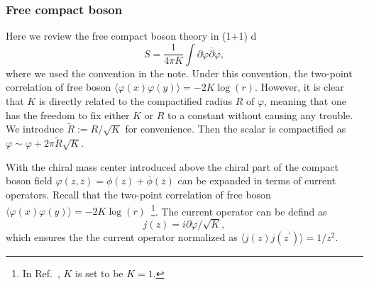 \documentclass[submission, PhysLectNotes]{SciPost}
\begin{document}
\subsubsection{Free compact boson}
Here we review the free compact boson theory in (1+1) d
\begin{equation}
	S = \frac{1}{4\pi K} \int \partial \varphi \overline{\partial}\varphi,
\end{equation}
where we used the convention in the note. Under this convention, the two-point correlation of free boson $\langle \varphi (x) \varphi(y) \rangle = -2 K \log (r)$. However, it is clear that $K$ is directly related to the compactified radius $R$ of $\varphi$, meaning that one has the freedom to fix either $K$ or $R$ to a constant without causing any trouble. We introduce $\tilde{R} := R/\sqrt{K}$ for convenience. Then the scalar is compactified as $\varphi \sim \varphi + 2\pi \tilde{R}\sqrt{K}$. %

With the chiral mass center introduced above the chiral part of the compact boson field $\varphi(z,\overline{z}) = \phi(z) + \overline{\phi}(\overline{z})$ can be expanded in terms of current operators. Recall that the two-point correlation of free boson $\langle \varphi (x) \varphi(y) \rangle = -2 K \log (r)$~\footnote{In Ref.~\cite{Blumenhagen:2009zz}, $K$ is set to be $K=1$.}. The current operator can be defind as 
\begin{equation}
	j(z) = i \partial \varphi/\sqrt{K},
\end{equation} 
which ensures the the current operator normalized as $\langle j(z) j(z^\prime) \rangle = 1/z^2$.
\end{document}
